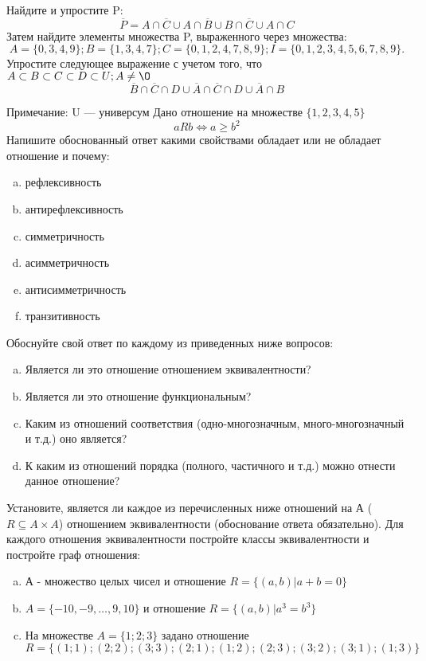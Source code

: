 \documentclass[10pt]{exam}
\begin{document}
\begin{questions}
\question
Найдите и упростите P:
\begin{equation*}
\overline{P} = A \cap \overline{C} \cup A \cap \overline{B} \cup B \cap \overline{C} \cup A \cap C
\end{equation*}
Затем найдите элементы множества P, выраженного через множества:
\begin{equation*}
A = \{0, 3, 4, 9\}; 
B = \{1, 3, 4, 7\};
C = \{0, 1, 2, 4, 7, 8, 9\};
I = \{0, 1, 2, 3, 4, 5, 6, 7, 8, 9\}.
\end{equation*}\question
Упростите следующее выражение с учетом того, что $A\subset B \subset C \subset D \subset U; A \neq \O$
\begin{equation*}
\overline{B} \cap \overline{C} \cap D \cup \overline{A} \cap \overline{C} \cap D \cup \overline{A} \cap B
\end{equation*}

Примечание: U — универсум\question
Дано отношение на множестве $\{1, 2, 3, 4, 5\}$ 
\begin{equation*}
aRb \iff a \geq b^2
\end{equation*}
Напишите обоснованный ответ какими свойствами обладает или не обладает отношение и почему:   
\begin{enumerate} [a)]\setcounter{enumi}{0}
\item рефлексивность
\item антирефлексивность
\item симметричность
\item асимметричность
\item антисимметричность
\item транзитивность
\end{enumerate}

Обоснуйте свой ответ по каждому из приведенных ниже вопросов:
\begin{enumerate} [a)]\setcounter{enumi}{0}
    \item Является ли это отношение отношением эквивалентности?
    \item Является ли это отношение функциональным?
    \item Каким из отношений соответствия (одно-многозначным, много-многозначный и т.д.) оно является?
    \item К каким из отношений порядка (полного, частичного и т.д.) можно отнести данное отношение?
\end{enumerate}


\question
Установите, является ли каждое из перечисленных ниже отношений на А ($R \subseteq A \times A$) отношением эквивалентности (обоснование ответа обязательно). Для каждого отношения эквивалентности 
постройте классы эквивалентности и постройте граф отношения:
\begin{enumerate}[a)]\setcounter{enumi}{0}
\item А - множество целых чисел и отношение $R = \{(a,b)|a + b = 0\}$
\item $A = \{-10, -9, …, 9, 10\}$ и отношение $R = \{(a,b)|a^{3} = b^{3}\}$
\item На множестве $A = \{1; 2; 3\}$ задано отношение $R = \{(1; 1); (2; 2); (3; 3); (2; 1); (1; 2); (2; 3); (3; 2); (3; 1); (1; 3)\}$


\end{enumerate}
\end{questions}
\end{document}
